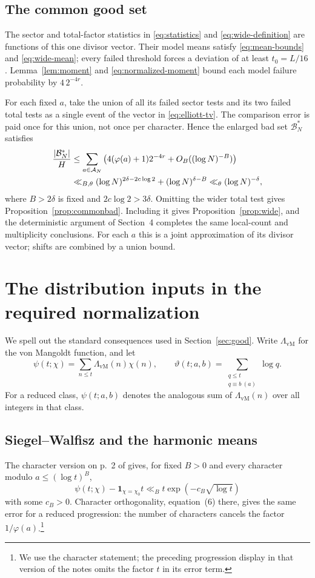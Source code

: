\documentclass[11pt]{article}
\theoremstyle{remark}\newtheorem{remark}[theorem]{Remark}
\newcommand{\one}{\mathbf 1}
\begin{document}
\subsection{The common good set}
The sector and total-factor statistics in \eqref{eq:statistics} and
\eqref{eq:wide-definition} are functions of this one divisor vector.
Their model means satisfy \eqref{eq:mean-bounds} and
\eqref{eq:wide-mean}; every failed threshold forces a deviation of
at least $t_0=L/16$. Lemma~\ref{lem:moment} and
\eqref{eq:normalized-moment} bound each model failure probability
by $4\,2^{-4r}$.

For each fixed $a$, take the union of all its failed sector tests
and its two failed total tests as a single event of the vector in
\eqref{eq:elliott-tv}. The comparison error is paid once for this
union, not once per character. Hence the enlarged bad set
$\mathcal B_N^*$ satisfies
\begin{align}
 \frac{|\mathcal B_N^*|}{H}
 &\le\sum_{a\in\mathcal A_N}
     \left(4(\varphi(a)+1)2^{-4r}
                +O_B((\log N)^{-B})\right)\notag\\
 &\ll_{B,\theta}
   (\log N)^{2\delta-2c\log2}
     +(\log N)^{\delta-B}
 \ll_\theta(\log N)^{-\delta},\label{eq:elliott-common-bad}
\end{align}
where $B>2\delta$ is fixed and $2c\log2>3\delta$.
Omitting the wider total test gives Proposition~\ref{prop:commonbad}.
Including it gives Proposition~\ref{prop:wide}, and the deterministic
argument of Section~4 completes the same local-count and multiplicity
conclusions. For each $a$ this is a joint approximation of its divisor
vector; shifts are combined by a union bound.

\section{The distribution inputs in the required normalization}\label{app:inputs}
We spell out the standard consequences used in Section~\ref{sec:good}. Write
$\Lambda_{\mathrm{vM}}$ for the von Mangoldt function, and let
\[
 \psi(t;\chi)=\sum_{n\le t}\Lambda_{\mathrm{vM}}(n)\chi(n),
 \qquad
 \vartheta(t;a,b)=\sum_{\substack{q\le t\\q\equiv b\ (a)}}\log q.
\]
For a reduced class, $\psi(t;a,b)$ denotes the analogous sum of
$\Lambda_{\mathrm{vM}}(n)$ over all integers in that class.

\subsection{Siegel--Walfisz and the harmonic means}
The character version on p.~2 of \cite{VaughanBV} gives, for fixed
$B>0$ and every character modulo $a\le(\log t)^B$,
\[
 \psi(t;\chi)-\one_{\chi=\chi_0}t
     \ll_B t\exp(-c_B\sqrt{\log t})
\]
with some $c_B>0$. Character orthogonality, equation~(6) there,
gives the same error for a reduced progression: the number of characters
cancels the factor $1/\varphi(a)$.\footnote{We use the character
statement; the preceding progression display in that version of the notes
omits the factor $t$ in its error term.}
\end{document}
